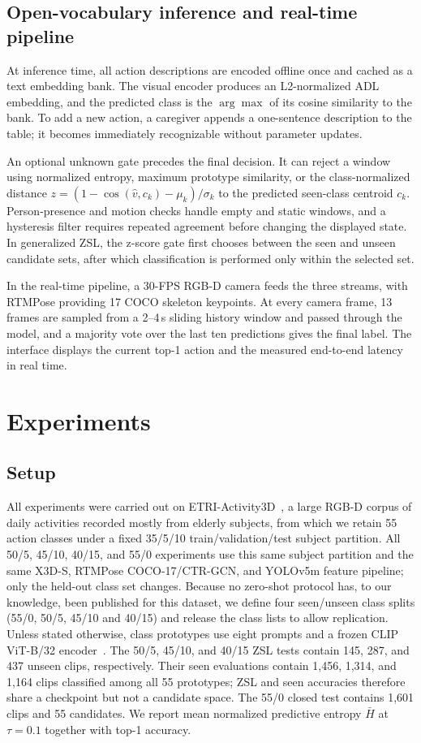 \documentclass[conference]{IEEEtran}
\begin{document}
\subsection{Open-vocabulary inference and real-time pipeline}
At inference time, all action descriptions are encoded offline once and cached
as a text embedding bank. The visual encoder produces an L2-normalized ADL
embedding, and the predicted class is the $\arg\max$ of its cosine similarity
to the bank. To add a new action, a caregiver appends a one-sentence description
to the table; it becomes immediately recognizable without parameter updates.

An optional unknown gate precedes the final decision. It can reject a window
using normalized entropy, maximum prototype similarity, or the class-normalized
distance $z=(1-\cos(\hat v,c_k)-\mu_k)/\sigma_k$ to the predicted seen-class
centroid $c_k$. Person-presence and motion checks handle empty and static
windows, and a hysteresis filter requires repeated agreement before changing
the displayed state. In generalized ZSL, the z-score gate first chooses between
the seen and unseen candidate sets, after which classification is performed
only within the selected set.

In the real-time pipeline, a 30-FPS RGB-D camera feeds the three streams,
with RTMPose providing 17 COCO skeleton keypoints. At every camera frame, 13 frames
are sampled from a 2--4\,s sliding history window and passed through the
model, and a majority vote over the last ten predictions gives the final
label. The interface displays the current top-1 action and the measured
end-to-end latency in real time.


\section{Experiments}

\subsection{Setup}
All experiments were carried out on ETRI-Activity3D~\cite{jang2020etri}, a
large RGB-D corpus of daily activities recorded mostly from elderly subjects,
from which we retain 55 action classes under a fixed 35/5/10
train/validation/test subject partition. All 50/5, 45/10, 40/15, and 55/0
experiments use this same subject partition and the same X3D-S,
RTMPose COCO-17/CTR-GCN, and YOLOv5m feature pipeline; only the held-out class
set changes. Because no zero-shot protocol has, to our
knowledge, been published for this dataset, we define four seen/unseen class
splits (55/0, 50/5, 45/10 and 40/15) and release the class lists to allow
replication. Unless stated otherwise, class prototypes use eight prompts and a
frozen CLIP ViT-B/32 encoder~\cite{radford2021clip}. The 50/5, 45/10, and 40/15
ZSL tests contain 145, 287, and 437 unseen clips, respectively. Their seen
evaluations contain 1,456, 1,314, and 1,164 clips classified among all 55
prototypes; ZSL and seen accuracies therefore share a checkpoint but not a
candidate space. The 55/0 closed test
contains 1,601 clips and 55 candidates. We report mean normalized predictive
entropy $\bar H$ at $\tau=0.1$ together with top-1 accuracy.
\end{document}
